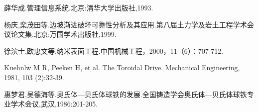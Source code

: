 
\begin{thebibliography}{99}\addtolength{\itemsep}{-1.5ex}

 薛华成.管理信息系统.北京:清华大学出版社,1993.

 杨庆,栾茂田等.边坡渐进破坏可靠性分析及其应用.第八届土力学及岩土工程学术会议论文集.北京:万国学术出版社,1999.

 徐滨士,欧忠文等.纳米表面工程.中国机械工程，2000，11（6）：707-712.

 Kuehnlw M R, Peeken H, et al. The Toroidal Drive. Mechanical Engineering, 1981, 103 (2):32-39.

 惠梦君,吴德海等.奥氏体—贝氏体球铁的发展.全国铸造学会奥氏体—贝氏体球铁专业学术会议,武汉,1986:201-205.

\end{thebibliography}